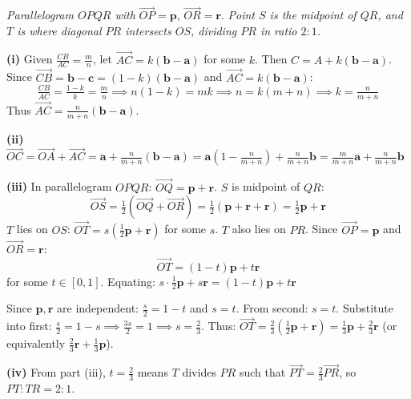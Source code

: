 \begin{problem}
\begin{center}
\end{center}

\vspace{0.5em}
\noindent\textit{Parallelogram $OPQR$ with} $\vec{OP}=\mathbf{p}$, $\vec{OR}=\mathbf{r}$. 
\textit{Point $S$ is the midpoint of $QR$, and $T$ is where diagonal $PR$ intersects $OS$, dividing $PR$ in ratio $2:1$.}
\end{problem}

\begin{solution}
\textbf{(i)} Given $\tfrac{CB}{AC} = \tfrac{m}{n}$, let $\vec{AC} = k(\mathbf{b} - \mathbf{a})$ for some $k$. Then $C = A + k(\mathbf{b} - \mathbf{a})$.
Since $\vec{CB} = \mathbf{b} - \mathbf{c} = (1-k)(\mathbf{b} - \mathbf{a})$ and $\vec{AC} = k(\mathbf{b} - \mathbf{a})$:
$$\tfrac{CB}{AC} = \tfrac{1-k}{k} = \tfrac{m}{n} \implies n(1-k) = mk \implies n = k(m+n) \implies k = \tfrac{n}{m+n}$$
Thus $\vec{AC} = \tfrac{n}{m+n}(\mathbf{b} - \mathbf{a})$.

\textbf{(ii)} $\vec{OC} = \vec{OA} + \vec{AC} = \mathbf{a} + \tfrac{n}{m+n}(\mathbf{b} - \mathbf{a}) = \mathbf{a}\left(1 - \tfrac{n}{m+n}\right) + \tfrac{n}{m+n}\mathbf{b} = \tfrac{m}{m+n}\mathbf{a} + \tfrac{n}{m+n}\mathbf{b}$

\textbf{(iii)} In parallelogram $OPQR$: $\vec{OQ} = \mathbf{p} + \mathbf{r}$. $S$ is midpoint of $QR$:
$$\vec{OS} = \tfrac{1}{2}(\vec{OQ} + \vec{OR}) = \tfrac{1}{2}(\mathbf{p} + \mathbf{r} + \mathbf{r}) = \tfrac{1}{2}\mathbf{p} + \mathbf{r}$$
$T$ lies on $OS$: $\vec{OT} = s(\tfrac{1}{2}\mathbf{p} + \mathbf{r})$ for some $s$.
$T$ also lies on $PR$. Since $\vec{OP} = \mathbf{p}$ and $\vec{OR} = \mathbf{r}$:
$$\vec{OT} = (1-t)\mathbf{p} + t\mathbf{r}$$ for some $t \in [0,1]$.
Equating: $s\cdot\tfrac{1}{2}\mathbf{p} + s\mathbf{r} = (1-t)\mathbf{p} + t\mathbf{r}$

Since $\mathbf{p}, \mathbf{r}$ are independent: $\tfrac{s}{2} = 1-t$ and $s = t$.
From second: $s = t$. Substitute into first: $\tfrac{s}{2} = 1-s \implies \tfrac{3s}{2} = 1 \implies s = \tfrac{2}{3}$.
Thus: $\vec{OT} = \tfrac{2}{3}(\tfrac{1}{2}\mathbf{p} + \mathbf{r}) = \tfrac{1}{3}\mathbf{p} + \tfrac{2}{3}\mathbf{r}$ (or equivalently $\tfrac{2}{3}\mathbf{r} + \tfrac{1}{3}\mathbf{p}$).

\textbf{(iv)} From part (iii), $t = \tfrac{2}{3}$ means $T$ divides $PR$ such that $\vec{PT} = \tfrac{2}{3}\vec{PR}$, so $PT:TR = 2:1$.
\end{solution}

